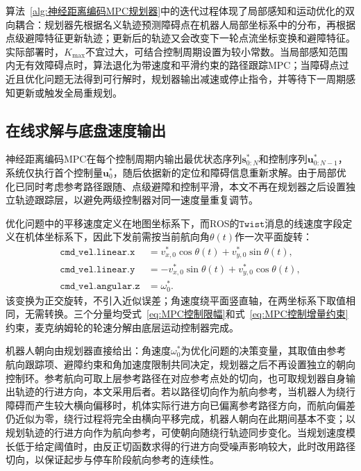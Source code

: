 算法~\ref{alg:神经距离编码MPC规划器}中的迭代过程体现了局部感知和运动优化的双向耦合：规划器先根据名义轨迹预测障碍点在机器人局部坐标系中的分布，再根据点级避障特征更新轨迹；更新后的轨迹又会改变下一轮点流坐标变换和避障特征。实际部署时，$K_{\max}$不宜过大，可结合控制周期设置为较小常数。当局部感知范围内无有效障碍点时，算法退化为带速度和平滑约束的路径跟踪MPC；当障碍点过近且优化问题无法得到可行解时，规划器输出减速或停止指令，并等待下一周期感知更新或触发全局重规划。

\subsection{在线求解与底盘速度输出}
神经距离编码MPC在每个控制周期内输出最优状态序列$\mathbf{s}_{0:N}^{*}$和控制序列$\mathbf{u}_{0:N-1}^{*}$，系统仅执行首个控制量$\mathbf{u}_{0}^{*}$，随后依据新的定位和障碍信息重新求解。由于局部优化已同时考虑参考路径跟随、点级避障和控制平滑，本文不再在规划器之后设置独立轨迹跟踪层，以避免两级控制器对同一速度量重复调节。

优化问题中的平移速度定义在地图坐标系下，而ROS的$\texttt{Twist}$消息的线速度字段定义在机体坐标系下，因此下发前需按当前航向角$\theta(t)$作一次平面旋转：
\begin{equation}
	\begin{aligned}
		\texttt{cmd\_vel.linear.x} &= v_{x,0}^{*}\cos\theta(t)+v_{y,0}^{*}\sin\theta(t),\\
		\texttt{cmd\_vel.linear.y} &= -v_{x,0}^{*}\sin\theta(t)+v_{y,0}^{*}\cos\theta(t),\\
		\texttt{cmd\_vel.angular.z} &= \omega_0^{*}.
	\end{aligned}
	\label{eq:ROS速度指令}
\end{equation}
该变换为正交旋转，不引入近似误差；角速度绕平面竖直轴，在两坐标系下取值相同，无需转换。三个分量均受式~\eqref{eq:MPC控制限幅}和式~\eqref{eq:MPC控制增量约束}约束，麦克纳姆轮的轮速分解由底层运动控制器完成。

机器人朝向由规划器直接给出：角速度$\omega_0^{*}$为优化问题的决策变量，其取值由参考航向跟踪项、避障约束和角加速度限制共同决定，规划器之后不再设置独立的朝向控制环。参考航向可取上层参考路径在对应参考点处的切向，也可取规划器自身输出轨迹的行进方向，本文采用后者。若以路径切向作为航向参考，当机器人为绕行障碍而产生较大横向偏移时，机体实际行进方向已偏离参考路径方向，而航向偏差仍近似为零，绕行过程将完全由横向平移完成，机器人朝向在此期间基本不变；以规划轨迹的行进方向作为航向参考，可使朝向随绕行轨迹同步变化。当规划速度模长低于给定阈值时，由反正切函数求得的行进方向受噪声影响较大，此时改用路径切向，以保证起步与停车阶段航向参考的连续性。

